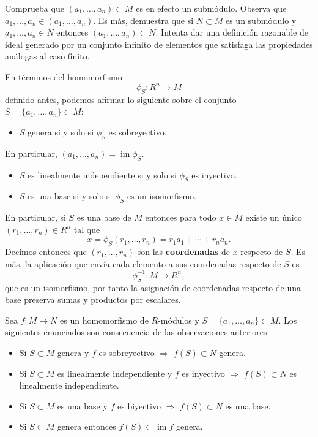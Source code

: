 
Comprueba que \((a_1,\dots,a_n)\subset M\) es en efecto un submódulo.
Observa que \(a_1,\dots,a_n\in (a_1,\dots, a_n)\). Es más, demuestra que
si \(N\subset M\) es un submódulo y \(a_1,\dots,a_n\in N\) entonces
\((a_1,\dots,a_n)\subset N\). Intenta dar una definición razonable de
ideal generado por un conjunto infinito de elementos que satisfaga las
propiedades análogas al caso finito. 


En términos del homomorfismo \[\phi_S\colon R^n\longrightarrow M\]
definido antes, podemos afirmar lo siguiente sobre el conjunto
\(S=\{a_1,\dots,a_n\}\subset M\):

\begin{itemize}
\tightlist
\item
  \(S\) genera si y solo si \(\phi_S\) es sobreyectivo.
\end{itemize}

En particular, \((a_1,\dots,a_n)=\operatorname{im} \phi_S\).

\begin{itemize}
\item
  \(S\) es linealmente independiente si y solo si \(\phi_S\) es
  inyectivo.
\item
  \(S\) es una base si y solo si \(\phi_S\) es un isomorfismo.
\end{itemize}

En particular, si \(S\) es una base de \(M\) entonces para todo
\(x\in M\) existe un único \((r_1,\dots,r_n)\in R^n\) tal que
\[x=\phi_S(r_1,\dots,r_n)=r_1a_1+\cdots+r_na_n.\] Decimos
entonces que \((r_1,\dots,r_n)\) son las \textbf{coordenadas} de \(x\)
respecto de \(S\). Es más, la aplicación que envía cada elemento a sus
coordenadas respecto de \(S\) es
\[\phi_S^{-1}\colon M\longrightarrow R^n,\] que es un isomorfismo, por
tanto la asignación de coordenadas respecto de una base preserva sumas y
productos por escalares. 


Sea \(f\colon M\rightarrow N\) es un homomorfismo de \(R\)-módulos y
\(S=\{a_1,\dots,a_n\}\subset M\). Los siguientes enunciados son
consecuencia de las observaciones anteriores:

\begin{itemize}
\item
  Si \(S\subset M\) genera y \(f\) es sobreyectivo \(\Rightarrow\)
  \(f(S)\subset N\) genera.
\item
  Si \(S\subset M\) es linealmente independiente y \(f\) es inyectivo
  \(\Rightarrow\) \(f(S)\subset N\) es linealmente independiente.
\item
  Si \(S\subset M\) es una base y \(f\) es biyectivo \(\Rightarrow\)
  \(f(S)\subset N\) es una base.
\item
  Si \(S\subset M\) genera entonces \(f(S)\subset\operatorname{im}f\)
  genera.
\end{itemize}

